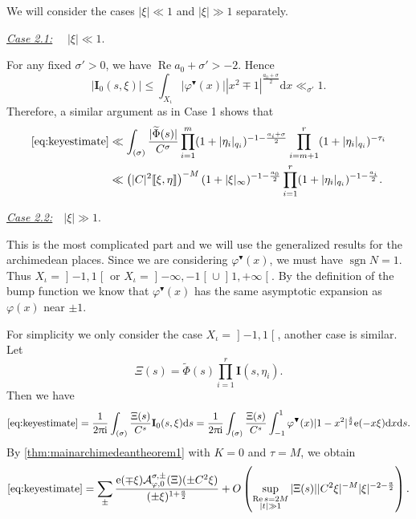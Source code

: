 \documentclass[10pt,oneside,reqno]{amsart}
\makeatletter
\newcommand\lopen{\mathopen{]}}
\newcommand\ropen{\mathclose{[}}
\newcommand\rmd{\mathrm{d}}
\newcommand\rme{\mathrm{e}}
\newcommand\rmi{\mathrm{i}}
\newcommand\cA{\mathcal{A}}
\newcommand\bI{\mathbf{I}}
\newcommand\dpii{2\uppi\rmi}
\renewcommand\Re{\mathop{\mathrm{Re}}}
\DeclareMathOperator\sgn{sgn}
\renewcommand\leq{\leqslant}
\theoremstyle{THEOREM}
\theoremstyle{DEFINITION}
\theoremstyle{EXERCISE}
\numberwithin{equation}{section}
\renewenvironment{proof}[1][\proofname]{\par
  \vspace{-6pt}
  \pushQED{\qed}
  \normalfont \topsep6\p@\@plus6\p@\relax
  \trivlist
  \item[\hskip\labelsep\rmfamily\bfseries
    #1\@addpunct{:}]\ignorespaces
}{
  \popQED\endtrivlist\@endpefalse
  \vspace{-6pt}
}
\makeatother
\begin{document}
\begin{proof}[Proof of \autoref{thm:mainfourierestimate}]
We will consider the cases $|\xi|\ll 1$ and $|\xi|\gg 1$ separately.

\underline{\emph{Case 2.1:}} \ \ $|\xi|\ll 1$.

For any fixed $\sigma'>0$, we have $\Re a_0+\sigma'>-2$. Hence
\[
|\bI_0(s,\xi)|\leq\int_{X_\iota}|\varphi^{\blacktriangledown}(x)||x^2\mp 1|^{\frac{a_0+\sigma}{2}}\rmd x\ll_{\sigma'} 1.
\]
Therefore, a similar argument as in Case 1 shows that
\begin{align*}
  \eqref{eq:keyestimate} & \ll \int_{(\sigma)}\frac{|\widetilde{\Phi}(s)|}{C^\sigma}\prod_{i=1}^{m} (1+|\eta_i|_{q_i})^{-1-\frac{a_i+\sigma}{2}} \prod_{i=m+1}^{r}(1+|\eta_i|_{q_i})^{-\tau_i} \\
 & \ll \left(|C|^2\llbracket\xi,\eta\rrbracket\right)^{-M} (1+|\xi|_\infty)^{-1-\frac{a_0}{2}}\prod_{i=1}^{r}(1+|\eta_i|_{q_i})^{-1-\frac{a_i}{2}}.
\end{align*}

\underline{\emph{Case 2.2:}}\ \ $|\xi|\gg 1$.

This is the most complicated part and we will use the generalized results for the archimedean places. Since we are considering $\varphi^\blacktriangledown(x)$, we must have $\sgn N=1$. Thus $X_\iota=\lopen -1,1\ropen$ or $X_\iota=\lopen -\infty,-1\ropen \cup \lopen 1,+\infty\ropen$. By the definition of the bump function we know that $\varphi^\blacktriangledown(x)$ has the same asymptotic expansion as  $\varphi(x)$ near $\pm 1$.

For simplicity we only consider the case $X_\iota=\lopen -1,1\ropen$, another case is similar.
Let
\[
\Xi(s)=\widetilde{\Phi}(s)\prod_{i=1}^{r}\bI(s,\eta_i).
\]
Then we have
\[
\eqref{eq:keyestimate}=\frac{1}{\dpii}\int_{(\sigma)}\frac{\Xi(s)}{C^s}\bI_0(s,\xi)\rmd s=
     \frac{1}{\dpii}\int_{(\sigma)}\frac{\Xi(s)}{C^s}\int_{-1}^{1}\varphi^\blacktriangledown(x)|1-x^2|^{\frac s2} \rme(-x\xi)\rmd x\rmd s .
\]
By \autoref{thm:mainarchimedeantheorem1} with $K=0$ and $\tau=M$, we obtain
\[
\eqref{eq:keyestimate}=\sum_{\pm}\frac{\rme(\mp \xi)\cA_{\varphi,0}^{\sigma,\pm}(\Xi)(\pm C^2\xi)}{(\pm\xi)^{1+\frac a2}}+ O\left(\sup_{\substack{\Re s=2M \\ |t|\gg 1}}|\Xi(s)||C^2\xi|^{-M}|\xi|^{-2-\frac{a}{2}}\right).
\]


\end{proof}
\end{document}
